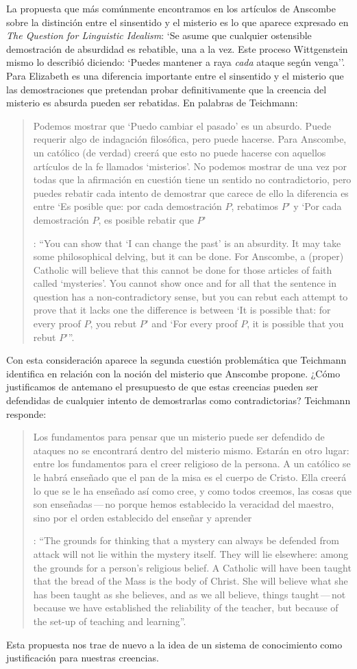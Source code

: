 La propuesta que más comúnmente encontramos en los artículos de Anscombe sobre la distinción entre el sinsentido y el misterio es lo que aparece expresado en \emph{The Question for Linguistic Idealism}: \enquote*{Se asume que cualquier ostensible demostración de absurdidad es rebatible, una a la vez. Este proceso Wittgenstein mismo lo describió diciendo: `Puedes mantener a raya \emph{cada} ataque según venga'}. Para Elizabeth es una diferencia importante entre el sinsentido y el misterio que las demostraciones que pretendan probar definitivamente que la creencia del misterio es absurda pueden ser rebatidas. En palabras de Teichmann: \blockquote[{\Cite[213-214]{teichmann2008ans}}: \enquote{You can show that `I can change the past' is an absurdity. It may take some philosophical delving, but it can be done. For Anscombe, a (proper) Catholic will believe that this cannot be done for those articles of faith called `mysteries'. \textelp{} You cannot show once and for all that the sentence in question has a non-contradictory sense, but you can rebut each attempt to prove that it lacks one \textelp{} the difference is between `It is possible that: for every proof $P$, you rebut $P$' and `For every proof $P$, it is possible that you rebut $P$'}.]{Podemos mostrar que `Puedo cambiar el pasado' es un absurdo. Puede requerir algo de indagación filosófica, pero puede hacerse. Para Anscombe, un católico (de verdad) creerá que esto no puede hacerse con aquellos artículos de la fe llamados `misterios'. \textelp{} No podemos mostrar de una vez por todas que la afirmación en cuestión tiene un sentido no contradictorio, pero puedes rebatir cada intento de demostrar que carece de ello \textelp{} la diferencia es entre `Es posible que: por cada demostración $P$, rebatimos $P$' y `Por cada demostración $P$, es posible rebatir que $P$'}. Con esta consideración aparece la segunda cuestión problemática que Teichmann identifica en relación con la noción del misterio que Anscombe propone. ¿Cómo justificamos de antemano el presupuesto de que estas creencias pueden ser defendidas de cualquier intento de demostrarlas como contradictorias? Teichmann responde: \blockquote[{\Cite[213-214]{teichmann2008ans}}: \enquote{The grounds for thinking that a mystery can always be defended from attack will not lie within the mystery itself. They will lie elsewhere: among the grounds for a person's religious belief. A Catholic will have been taught that the bread of the Mass is the body of Christ. She will believe what she has been taught as she believes, and as we all believe, things taught\,---\,not because we have established the reliability of the teacher, but because of the set-up of teaching and learning}.]{Los fundamentos para pensar que un misterio puede ser defendido de ataques no se encontrará dentro del misterio mismo. Estarán en otro lugar: entre los fundamentos para el creer religioso de la persona. A un católico se le habrá enseñado que el pan de la misa es el cuerpo de Cristo. Ella creerá lo que se le ha enseñado así como cree, y como todos creemos, las cosas que son enseñadas\,---\,no porque hemos establecido la veracidad del maestro, sino por el orden establecido del enseñar y aprender}. Esta propuesta nos trae de nuevo a la idea de un sistema de conocimiento como justificación para nuestras creencias.

